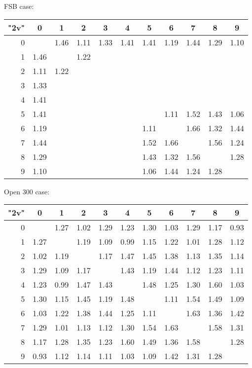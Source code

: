 \begin{table}
	\vspace{0.6cm}
	
	FSB case:
	
	\vspace{0.6cm}
	
	\begin{tabular}{|r||c|c|c|c|c|c|c|c|c|c|}\hline
		{\bf "2v"} & 0 & 1 & 2 & 3 & 4 & 5 & 6 & 7 & 8 & 9 \\\hline\hline
		0 & &1.46 &1.11 &1.33 &1.41 &1.41 &1.19 &1.44 &1.29 &1.10  \\\hline
		1 &1.46 & &1.22 & & & & & & &  \\\hline
		2 &1.11 &1.22 & & & & & & & &  \\\hline
		3 &1.33 & & & & & & & & &  \\\hline
		4 &1.41 & & & & & & & & &  \\\hline
		5 &1.41 & & & & & &1.11 &1.52 &1.43 &1.06  \\\hline
		6 &1.19 & & & & &1.11 & &1.66 &1.32 &1.44  \\\hline
		7 &1.44 & & & & &1.52 &1.66 & &1.56 &1.24  \\\hline
		8 &1.29 & & & & &1.43 &1.32 &1.56 & &1.28  \\\hline
		9 &1.10 & & & & &1.06 &1.44 &1.24 &1.28 &  \\\hline
	\end{tabular}
	
	
		\vspace{0.6cm}
	
	Open 300 case:
	
	\vspace{0.6cm}
	
	\begin{tabular}{|r||c|c|c|c|c|c|c|c|c|c|}\hline
		{\bf "2v"} & 0 & 1 & 2 & 3 & 4 & 5 & 6 & 7 & 8 & 9 \\\hline\hline
	0 & &1.27 &1.02 &1.29 &1.23 &1.30 &1.03 &1.29 &1.17 &0.93  \\\hline
	1 &1.27 & &1.19 &1.09 &0.99 &1.15 &1.22 &1.01 &1.28 &1.12  \\\hline
	2 &1.02 &1.19 & &1.17 &1.47 &1.45 &1.38 &1.13 &1.35 &1.14  \\\hline
	3 &1.29 &1.09 &1.17 & &1.43 &1.19 &1.44 &1.12 &1.23 &1.11  \\\hline
	4 &1.23 &0.99 &1.47 &1.43 & &1.48 &1.25 &1.30 &1.60 &1.03  \\\hline
	5 &1.30 &1.15 &1.45 &1.19 &1.48 & &1.11 &1.54 &1.49 &1.09  \\\hline
	6 &1.03 &1.22 &1.38 &1.44 &1.25 &1.11 & &1.63 &1.36 &1.42  \\\hline
	7 &1.29 &1.01 &1.13 &1.12 &1.30 &1.54 &1.63 & &1.58 &1.31  \\\hline
	8 &1.17 &1.28 &1.35 &1.23 &1.60 &1.49 &1.36 &1.58 & &1.28  \\\hline
	9 &0.93 &1.12 &1.14 &1.11 &1.03 &1.09 &1.42 &1.31 &1.28 &  \\\hline
	\end{tabular}
	
\end{table}


